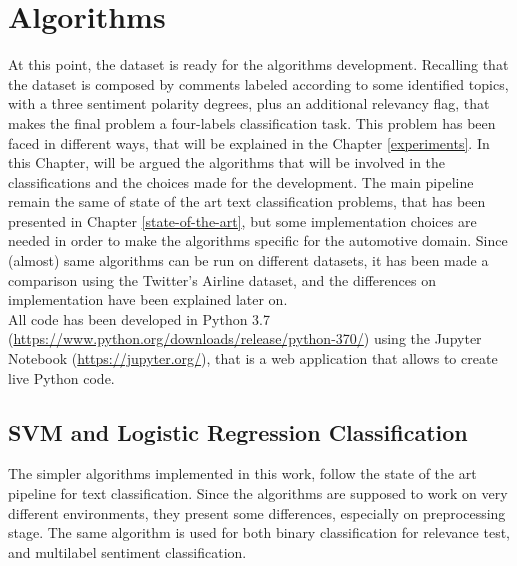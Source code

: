 
\chapter{Algorithms}
\label{algorithms}

At this point, the dataset is ready for the algorithms development. Recalling that the dataset is composed by comments labeled according to some identified topics, with a three sentiment polarity degrees, plus an additional relevancy flag, that makes the final problem a four-labels classification task. This problem has been faced in different ways, that will be explained in the Chapter \ref{experiments}. In this Chapter, will be argued the algorithms that will be involved in the classifications and the choices made for the development. The main pipeline remain the same of state of the art text classification problems, that has been presented in Chapter \ref{state-of-the-art}, but some implementation choices are needed in order to make the algorithms specific for the automotive domain. Since (almost) same algorithms can be run on different datasets, it has been made a comparison using the Twitter's Airline dataset, and the differences on implementation have been explained later on.\\
All code has been developed in Python 3.7 (\url{https://www.python.org/downloads/release/python-370/}) using the Jupyter Notebook (\url{https://jupyter.org/}), that is a web application that allows to create live Python code. 


\section{SVM and Logistic Regression Classification}

The simpler algorithms implemented in this work, follow the state of the art pipeline for text classification. Since the algorithms are supposed to work on very different environments, they present some differences, especially on preprocessing stage. The same algorithm is used for both binary classification for relevance test, and multilabel sentiment classification.\\


